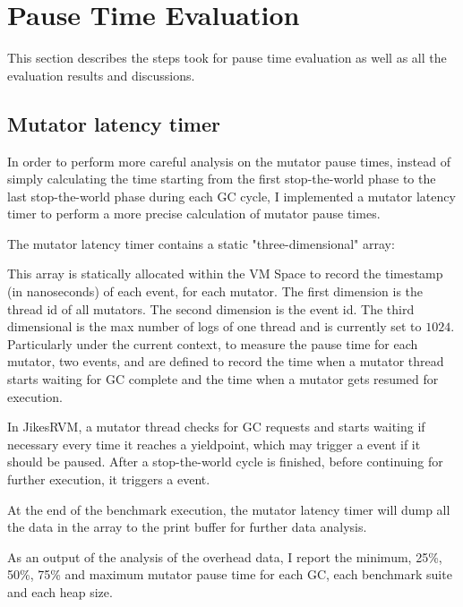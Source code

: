 \section{Pause Time Evaluation} %
\label{sec:pausetime}

This section describes the steps took for pause time evaluation as well as
all the evaluation results and discussions.

\subsection{Mutator latency timer}

In order to perform more careful analysis on the mutator pause times, instead of
simply calculating the time starting from the first stop-the-world phase to the last
stop-the-world phase during each GC cycle, I implemented a mutator latency timer
to perform a more precise calculation of mutator pause times.

The mutator latency timer contains a static "three-dimensional" array:\\
\centerline{}
This array is statically allocated within the VM Space to record the timestamp (in nanoseconds)
of each event, for each mutator. The first dimension is the thread id of all
mutators. The second dimension is the event id. The third dimensional  is the
max number of logs of one thread and is currently set to $1024$. Particularly under
the current context, to measure the pause time for each mutator, two events,
 and  are defined to record the time when a
mutator thread starts waiting for GC complete and the time when a mutator gets resumed for execution.

In JikesRVM, a mutator thread checks for GC requests and starts waiting if necessary every
time it reaches a yieldpoint, which may trigger a  event if it should
be paused. After a stop-the-world cycle is finished, before continuing for further execution,
it triggers a  event.

At the end of the benchmark execution, the mutator latency timer will dump all the
data in the  array to the print buffer for further data analysis.

As an output of the analysis of the overhead data, I report the minimum, 25\%, 50\%,
75\% and maximum mutator pause time for each GC, each benchmark suite and each heap size.

